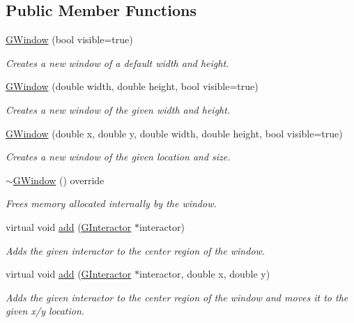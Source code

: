 \subsection*{Public Member Functions}
\begin{DoxyCompactItemize}
\item 
\mbox{\hyperlink{classGWindow_a7fdeab875fb526a49423085ac13ac9f2}{G\+Window}} (bool visible=true)
\begin{DoxyCompactList}\small\item\em Creates a new window of a default width and height. \end{DoxyCompactList}\item 
\mbox{\hyperlink{classGWindow_acb88532777f61b140aa8245ed1d9887e}{G\+Window}} (double width, double height, bool visible=true)
\begin{DoxyCompactList}\small\item\em Creates a new window of the given width and height. \end{DoxyCompactList}\item 
\mbox{\hyperlink{classGWindow_ac66942f456baa6c43ecd0ed60138fe36}{G\+Window}} (double x, double y, double width, double height, bool visible=true)
\begin{DoxyCompactList}\small\item\em Creates a new window of the given location and size. \end{DoxyCompactList}\item 
\mbox{\hyperlink{classGWindow_ab867b220db73c03e315b48c01f868e27}{$\sim$\+G\+Window}} () override
\begin{DoxyCompactList}\small\item\em Frees memory allocated internally by the window. \end{DoxyCompactList}\item 
virtual void \mbox{\hyperlink{classGWindow_a6f99b7c841256dbdc5acaafbbca4e685}{add}} (\mbox{\hyperlink{classGInteractor}{G\+Interactor}} $\ast$interactor)
\begin{DoxyCompactList}\small\item\em Adds the given interactor to the center region of the window. \end{DoxyCompactList}\item 
virtual void \mbox{\hyperlink{classGWindow_aca25fb0fc7d200e9c4fd23830d2d413d}{add}} (\mbox{\hyperlink{classGInteractor}{G\+Interactor}} $\ast$interactor, double x, double y)
\begin{DoxyCompactList}\small\item\em Adds the given interactor to the center region of the window and moves it to the given x/y location. \end{DoxyCompactList}\item 

\end{DoxyCompactItemize}
